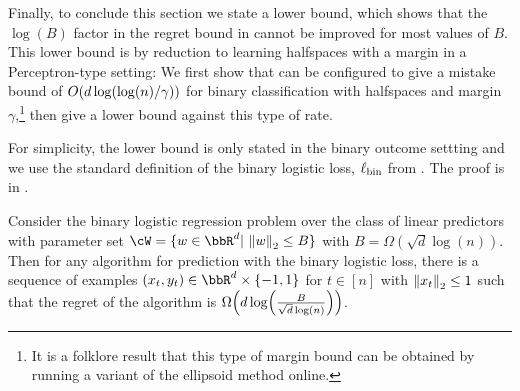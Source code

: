 Finally, to conclude this section we state a lower bound, which shows that the $\log(B)$ factor in the regret bound in  cannot be improved for most values of $B$. This lower bound is by reduction to learning halfspaces with a margin in a Perceptron-type setting: We first show that  can be configured to give a mistake bound of $O\prn*{d\log(\log(n)/\gamma)}$ for binary classification with halfspaces and margin $\gamma$,\footnote{It is a folklore result that this type of margin bound can be obtained by running a variant of the ellipsoid method online.} then give a lower bound against this type of rate. 

For simplicity, the lower bound is only stated in the binary outcome settting and we use the standard definition of the binary logistic loss, $\ls_\text{bin}$ from . The proof is in .
\begin{theorem}
\label{thm:logb_lower_bound}
Consider the binary logistic regression problem over the class of linear predictors with parameter set $\cW = \{w \in \R^{d}|\ \nrm*{w}_2 \leq B\}$ with $B=\Omega(\sqrt{d}\log(n))$. Then for any algorithm for prediction with the binary logistic loss, there is a sequence of examples $(x_t, y_t) \in \R^d \times \{-1, 1\}$ for $t \in [n]$ with $\nrm*{x_t}_2\leq{}1$ such that the regret of the algorithm is $\Omega\prn*{
d\log\prn*{
\frac{B}{\sqrt{d}\log(n)}
}
}$.
\end{theorem}

